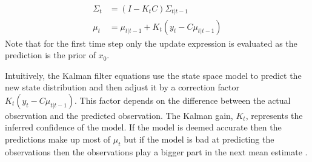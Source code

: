 \begin{align}
\Sigma_t &= (I-K_tC)\Sigma_{t|t-1} 
\label{eq_filter_covar} \\
\mu_t &= \mu_{t|t-1} + K_t(y_t - C\mu_{t|t-1})
\label{eq_filter_mean}
\end{align}
Note that for the first time step only the update expression is evaluated as the prediction is the prior of $x_0$. 

Intuitively, the Kalman filter equations use the state space model to predict the new state distribution and then adjust it by a correction factor $K_t(y_t - C\mu_{t|t-1})$. This factor depends on the difference between the actual observation and the predicted observation. The Kalman gain, $K_t$, represents the inferred confidence of the model. If the model is deemed accurate then the predictions make up most of $\mu_t$ but if the model is bad at predicting the observations then the observations play a bigger part in the next mean estimate \cite{bishop}. 

